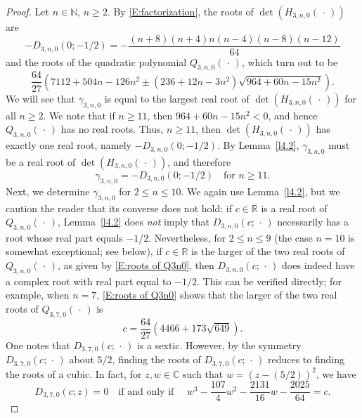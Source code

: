 \documentclass[reqno,11pt,centertags]{amsart}
\newcommand{\bbN}{{\mathbb{N}}}
\newcommand{\bbR}{{\mathbb{R}}}
\newcommand{\bbC}{{\mathbb{C}}}
\newcommand{\<}{\langle}
\renewcommand{\>}{\rangle}
\newcommand{\lb}{\label}
\newcommand{\dott}{\,\cdot\,}
\numberwithin{equation}{section}
\theoremstyle{definition}
\begin{document}
\begin{proof} 
Let  $n\in \bbN$, $n\geq 2$. 
By \eqref{E:factorization}, the roots of $\det (H_{3,n,0}(\dott))$ are 
\begin{equation}\label{E:-D3n0} 
-D_{3,n,0}(0; -1/2)= - \frac{(n+8)(n+4)n(n-4)(n-8)(n-12)}{64} 
\end{equation}
and the roots of the quadratic polynomial $Q_{3,n,0}(\dott)$, which turn out to be
\begin{equation}\label{E:roots of Q3n0} 
 \frac{64}{27} \left(7112+504n -126 n^2 \pm(236+12n-3 n^2)\sqrt{964+60n-15 n^2}\right).
\end{equation}
We will see that $\gamma_{3,n,0}$ is equal to the largest real root of $\det(H_{3,n,0}(\dott))$ for all $n \geq 2$.
We note that if $n \geq 11$, then $964 + 60n - 15n^2 < 0$, and hence $Q_{3,n,0}(\dott)$ has no real roots. Thus, $n \geq 11$,  then $\det(H_{3,n,0}(\dott))$ has exactly one real root, namely $-D_{3,n,0}(0; -1/2)$.
By Lemma~\ref{l4.2}, $\gamma_{3,n,0}$ must be a real root of $\det(H_{3,n,0}(\dott))$, and therefore
\begin{equation}\lb{E : leq 12}
\gamma_{3,n,0} = -D_{3,n,0}(0; -1/2)\quad \text{for } n \geq 11.
\end{equation}
Next, we determine $\gamma_{3,n,0}$ for $2 \leq n \leq 10$. We again use Lemma~\ref{l4.2}, but we caution the reader that its converse does not hold: if $c \in \bbR$ is a real root of $Q_{3,n,0}(\dott)$, Lemma~\ref{l4.2} does \emph{not} imply that $D_{3,n,0}(c;\dott)$ necessarily has a root whose real part equals $-1/2$. Nevertheless, for $2 \leq n \leq 9$ (the case $n=10$ is somewhat exceptional; see below), if $c \in \bbR$ is the larger of the two real roots of $Q_{3,n,0}(\dott)$, as given by \eqref{E:roots of Q3n0}, then $D_{3,n,0}(c;\dott)$ does indeed have a complex root with real part equal to $-1/2$. This can be verified directly; for example, when $n=7$, \eqref{E:roots of Q3n0} shows that the larger of the two real roots of $Q_{3,7,0}(\dott)$ is
\begin{equation}\label{E:c for n=7}
c = \frac{64}{27}(4466 + 173\sqrt{649}).
\end{equation}
One notes that $D_{3,7,0}(c;\dott)$ is a sextic. However, by the symmetry $D_{3,7,0}(c;\dott)$ about $5/2$, finding the roots of $D_{3,7,0}(c;\dott)$ reduces to finding the roots of a cubic.
In fact, for  $z,w \in \bbC$ such that $w=(z-(5/2))^2$, we have
\begin{equation}
D_{3,7,0}(c;z)=0 \quad \mbox{if and only if }\quad 
w^3-\frac{107}{4} w^2 -\frac{2131}{16} w -\frac{2025}{64}  = c.

\end{equation}
\end{proof}
\end{document}
